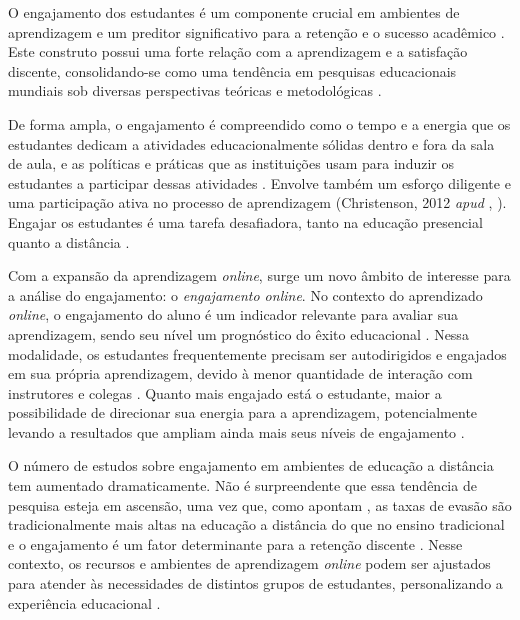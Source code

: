 O engajamento dos estudantes é um componente crucial em ambientes de aprendizagem e um preditor significativo para a retenção e o sucesso acadêmico \cite{yilmazEngagementDistanceEducation2020}. Este construto possui uma forte relação com a aprendizagem e a satisfação discente, consolidando-se como uma tendência em pesquisas educacionais mundiais sob diversas perspectivas teóricas e metodológicas \cite{ortegaMensuracaoEngajamentoOnline2022}.

De forma ampla, o engajamento é compreendido como o tempo e a energia que os estudantes dedicam a atividades educacionalmente sólidas dentro e fora da sala de aula, e as políticas e práticas que as instituições usam para induzir os estudantes a participar dessas atividades \cite{kuhWhatWereLearning2003}. Envolve também um esforço diligente e uma participação ativa no processo de aprendizagem (Christenson, 2012 \textit{apud} \citeauthor{henrieMeasuringStudentEngagement2015}, \citeyear{henrieMeasuringStudentEngagement2015}). Engajar os estudantes é uma tarefa desafiadora, tanto na educação presencial quanto a distância \cite{yilmazEngagementDistanceEducation2020}.

Com a expansão da aprendizagem \textit{online}, surge um novo âmbito de interesse para a análise do engajamento: o \textit{engajamento online}. No contexto do aprendizado \textit{online}, o engajamento do aluno é um indicador relevante para avaliar sua aprendizagem, sendo seu nível um prognóstico do êxito educacional \cite{ortegaMensuracaoEngajamentoOnline2022}. Nessa modalidade, os estudantes frequentemente precisam ser autodirigidos e engajados em sua própria aprendizagem, devido à menor quantidade de interação com instrutores e colegas \cite{langePascarellaTerenzin20052014}. Quanto mais engajado está o estudante, maior a possibilidade de direcionar sua energia para a aprendizagem, potencialmente levando a resultados que ampliam ainda mais seus níveis de engajamento \cite{ortegaMensuracaoEngajamentoOnline2022}.

O número de estudos sobre engajamento em ambientes de educação a distância tem aumentado dramaticamente. Não é surpreendente que essa tendência de pesquisa esteja em ascensão, uma vez que, como apontam , as taxas de evasão são tradicionalmente mais altas na educação a distância do que no ensino tradicional e o engajamento é um fator determinante para a retenção discente \cite{yilmazEngagementDistanceEducation2020}. Nesse contexto, os recursos e ambientes de aprendizagem \textit{online} podem ser ajustados para atender às necessidades de distintos grupos de estudantes, personalizando a experiência educacional \cite{ortegaMensuracaoEngajamentoOnline2022}.

